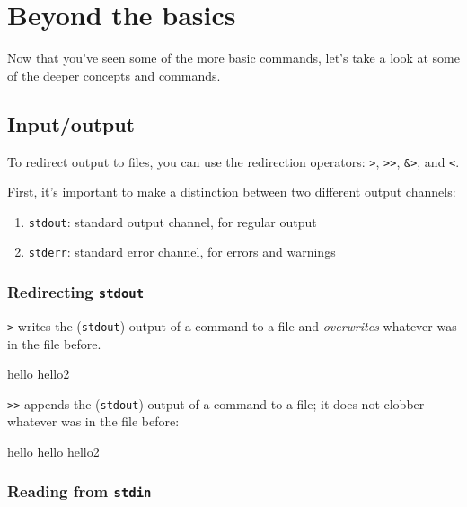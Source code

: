 \chapter{Beyond the basics}

Now that you've seen some of the more basic commands, let's take a look at some
of the deeper concepts and commands.

\section{Input/output}

To redirect output to files, you can use the redirection operators: \lstinline|>|,
\lstinline|>>|, \lstinline|&>|, and \lstinline|<|.

First, it's important to make a distinction between two different output
channels:

\begin{enumerate}
 \item \lstinline|stdout|: standard output channel, for regular output
 \item \lstinline|stderr|: standard error channel, for errors and warnings
\end{enumerate}

\subsection{Redirecting \texttt{stdout}}

\lstinline|>| writes the (\lstinline|stdout|) output of a command to a file and \emph{overwrites}
whatever was in the file before.

\begin{prompt}
hello
hello2
\end{prompt}

\lstinline|>>| appends the (\lstinline|stdout|) output of a command to a file; it does not clobber
whatever was in the file before:

\begin{prompt}
hello
hello
hello2
\end{prompt}

\subsection{Reading from \texttt{stdin}}

